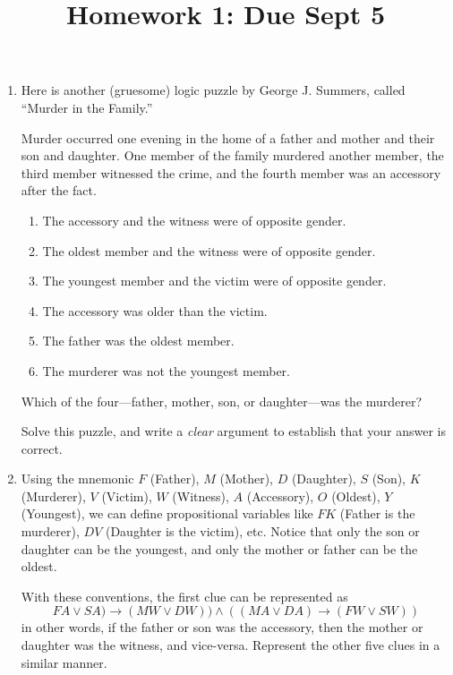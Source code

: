 \documentclass[12pt]{amsart}
\theoremstyle{definition}
\begin{document}
\title{Homework 1: Due Sept 5}

\maketitle

\begin{enumerate}

\item Here is another (gruesome) logic puzzle by George J. Summers, 
called “Murder in the Family.”

Murder occurred one evening in the home of a father and mother
and their son and daughter. One member of the family murdered
another member, the third member witnessed the crime, and the
fourth member was an accessory after the fact.

\begin{enumerate}
\item The accessory and the witness were of opposite gender.
\item The oldest member and the witness were of opposite gender.
\item The youngest member and the victim were of opposite gender.
\item The accessory was older than the victim.
\item The father was the oldest member.
\item The murderer was not the youngest member.
\end{enumerate}
Which of the four—father, mother, son, or daughter—was the murderer?

Solve this puzzle, and write a \textit{clear} argument to establish 
that your answer is correct.

\item Using the mnemonic $F$ (Father), $M$ (Mother), $D$ (Daughter), 
$S$ (Son), $K$ (Murderer), $V$ (Victim), $W$ (Witness), $A$ 
(Accessory), $O$ (Oldest), $Y$ (Youngest), we can define propositional 
variables like $FK$ (Father is the murderer), $DV$ (Daughter is 
the victim), etc.
Notice that only the son or daughter can be the youngest, and only the mother
or father can be the oldest.

With these conventions, the first clue can be represented as
\begin{displaymath}
FA \lor SA) \to (MW \lor DW)) \land ((MA \lor DA) \to (FW \lor SW))
\end{displaymath}
in other words, if the father or son was the accessory, then the mother or
daughter was the witness, and vice-versa. Represent the other five clues in a
similar manner.


\end{enumerate}
\end{document}
